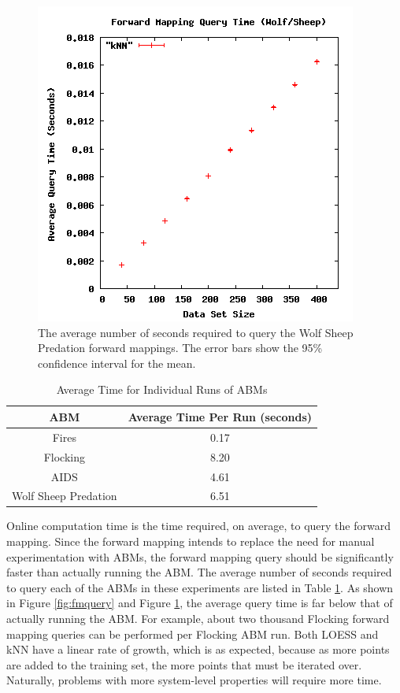 \begin{figure}[ht]
\centering
\includegraphics[scale=.5]{images/results_wolfsheep/fm-query.png}
\caption{The average number of seconds required to query the Wolf Sheep Predation forward mappings.
The error bars show the 95\% confidence interval for the mean.}
\label{fig:wolfsheepfmquery}
\end{figure}


\begin{table}[ht]
  \caption{Average Time for Individual Runs of ABMs}
  \centering
  \begin{tabular}{c c}
    \hline \hline
    ABM & Average Time Per Run (seconds)\\
    \hline
    Fires & 0.17\\
    Flocking & 8.20\\
    AIDS & 4.61\\
    Wolf Sheep Predation & 6.51\\
    \hline
  \end{tabular}
  \label{table:runtimes}
\end{table}


Online computation time is the time required, on average, to query the forward mapping.
Since the forward mapping intends to replace the need for manual experimentation with ABMs, the forward mapping query should be significantly faster than actually running the ABM.
The average number of seconds required to query each of the ABMs in these experiments are listed in Table \ref{table:runtimes}.
As shown in Figure \ref{fig:fmquery} and Figure \ref{fig:wolfsheepfmquery}, the average query time is far below that of actually running the ABM.
For example, about two thousand Flocking forward mapping queries can be performed per Flocking ABM run.
Both LOESS and kNN have a linear rate of growth, which is as expected, because as more points are added to the training set, the more points that must be iterated over.
Naturally, problems with more system-level properties will require more time.

